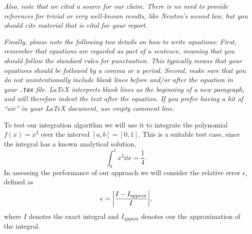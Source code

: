 \documentclass[english,notitlepage,reprint,nofootinbib]{revtex4-1}  %
\begin{document}
\textit{Also, note that we cited a source for our claim. There is no need to provide references for trivial or very well-known results, like Newton's second law, but you should cite material that is vital for your report.}

\textit{Finally, please note the following two details on how to write equations: First, remember that equations are regarded as part of a sentence, meaning that you should follow the standard rules for punctuation. This typically means that your equations should be followed by a comma or a period. Second, make sure that you do not unintentionally include blank lines before and/or after the equation in your \texttt{.tex} file. LaTeX interprets blank lines as the beginning of a new paragraph, and will therefore indent the text after the equation. If you prefer having a bit of ``air'' in your LaTeX document, use empty comment line.}

To test our integration algorithm we will use it to integrate the polynomial $f(x) = x^3$ over the interval $[a,b] = [0,1]$. This is a suitable test case, since the integral has a known analytical solution,
\begin{equation}
    \int_0^1 x^3 \dd x = \frac{1}{4}.
\end{equation}
In assessing the performance of our approach we will consider the relative error $\epsilon$, defined as 
\begin{equation}
    \epsilon = \abs{ \frac{I - I_{\text{approx}}}{I} },
\end{equation}
where $I$ denotes the exact integral and $I_\text{approx}$ denotes our the approximation of the integral.


\end{document}
